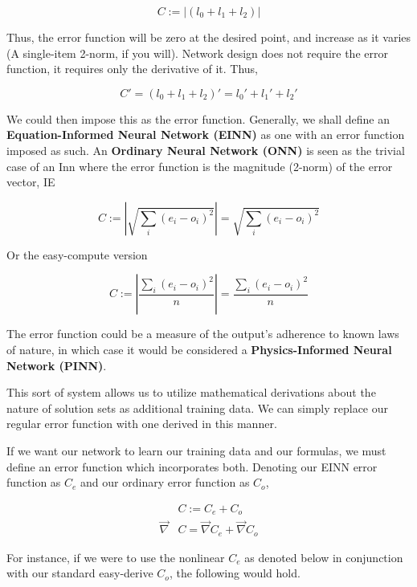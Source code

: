 \documentclass[8pt]{amsart}
\begin{document}
\[
    C := |(l_0 + l_1 + l_2)|
\]

Thus, the error function will be zero at the desired point,
and increase as it varies (A single-item 2-norm, if you will).
Network design does not require the error function, it requires
only the derivative of it. Thus,

\[
    C' = (l_0 + l_1 + l_2)' = l_0' + l_1' + l_2'
\]

We could then impose this as the error function. Generally,
we shall define an \textbf{Equation-Informed Neural Network (EINN)}
as one with an error function imposed as such. An \textbf{Ordinary Neural 
Network (ONN)} is seen as the trivial case of an Inn where the error
function is the magnitude (2-norm) of the error vector, IE 

\[
    C := | \sqrt{\sum_i{(e_i - o_i)^2}} | = \sqrt{\sum_i{(e_i - o_i)^2}}
\]

Or the easy-compute version

\[
    C := | \frac{\sum_i{(e_i - o_i)^2}}{n} | = \frac{\sum_i{(e_i - o_i)^2}}{n}
\]

The error function could be a measure of the output's adherence to known
laws of nature, in which case it would be considered a \textbf{Physics-Informed
Neural Network (PINN)}.

This sort of system allows us to utilize mathematical derivations about
the nature of solution sets as additional training data. We can simply replace
our regular error function with one derived in this manner.

If we want our network to learn our training data and our formulas, we must
define an error function which incorporates both. Denoting our EINN error
function as $C_e$ and our ordinary error function as $C_o$,

\[
\begin{aligned}
    &C := C_e + C_o \\
    \vec{\nabla} &C = \vec{\nabla}C_e + \vec{\nabla}C_o
\end{aligned}
\]

For instance, if we were to use the nonlinear $C_e$ as denoted below
in conjunction with our standard easy-derive $C_o$, the following would
hold.
\end{document}
